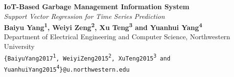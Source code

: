 \documentclass[a0b,portrait]{a0poster}
\begin{document}
\begin{minipage}{\linewidth}
\centering
\VeryHuge \color{NavyBlue} \textbf{IoT-Based Garbage Management Information System} \color{Black}\\%
\Huge\textit{Support Vector Regression for Time Series Prediction}\\[1cm] %
\huge \textbf{Baiyu Yang\textsuperscript{1}, Weiyi Zeng\textsuperscript{2}, Xu Teng\textsuperscript{3} and Yuanhui Yang\textsuperscript{4}}\\[0.5cm] %
\huge Department of Electrical Engineering and Computer Science, Northwestern University\\[0.4cm] %
\Large \texttt{\{BaiyuYang2017\textsuperscript{1}, WeiyiZeng2015\textsuperscript{2}, XuTeng2015\textsuperscript{3} and YuanhuiYang2015\textsuperscript{4}\}@u.northwestern.edu}\\
\end{minipage}

\vspace{1cm} %

\end{document}
